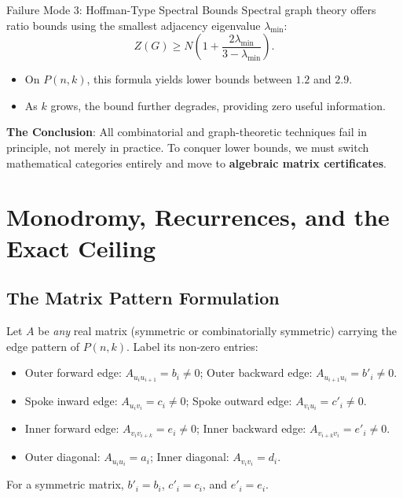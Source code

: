 \documentclass[11pt]{article}
\begin{document}
\begin{callbox}{Failure Mode 3: Hoffman-Type Spectral Bounds}
Spectral graph theory offers ratio bounds using the smallest adjacency eigenvalue $\lambda_{\min}$:
\begin{equation}
  Z(G) \ge N \left( 1 + \frac{2\lambda_{\min}}{3 - \lambda_{\min}} \right).
\end{equation}
\begin{itemize}[leftmargin=*,nosep]
  \item On $P(n,k)$, this formula yields lower bounds between $1.2$ and $2.9$.
  \item As $k$ grows, the bound further degrades, providing zero useful information.
\end{itemize}
\end{callbox}

\noindent
\textbf{The Conclusion}: All combinatorial and graph-theoretic techniques fail in principle, not merely in practice. To conquer lower bounds, we must switch mathematical categories entirely and move to \textbf{algebraic matrix certificates}.

\newpage

\section{Monodromy, Recurrences, and the Exact Ceiling}

\subsection{The Matrix Pattern Formulation}

Let $A$ be \emph{any} real matrix (symmetric or combinatorially symmetric) carrying the edge pattern of $P(n,k)$. Label its non-zero entries:
\begin{itemize}[leftmargin=*,nosep]
  \item Outer forward edge: $A_{u_i u_{i+1}} = b_i \ne 0$; Outer backward edge: $A_{u_{i+1} u_i} = b'_i \ne 0$.
  \item Spoke inward edge: $A_{u_i v_i} = c_i \ne 0$; Spoke outward edge: $A_{v_i u_i} = c'_i \ne 0$.
  \item Inner forward edge: $A_{v_i v_{i+k}} = e_i \ne 0$; Inner backward edge: $A_{v_{i+k} v_i} = e'_i \ne 0$.
  \item Outer diagonal: $A_{u_i u_i} = a_i$; Inner diagonal: $A_{v_i v_i} = d_i$.
\end{itemize}
For a symmetric matrix, $b'_i = b_i$, $c'_i = c_i$, and $e'_i = e_i$.
\end{document}
